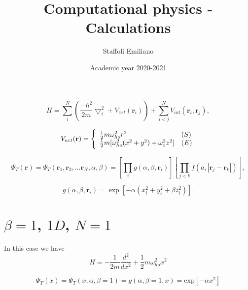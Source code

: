 \documentclass{article}
\title{Computational physics - Calculations}
\author{Staffoli Emiliano}
\date{Academic year 2020-2021}
\begin{document}
\maketitle
\thispagestyle{empty}
\newpage
\setcounter{page}{1}

\begin{equation}
    H = \sum_i^N \left(\frac{-\hbar^2}{2m}{\bigtriangledown }_{i}^2 +V_{ext}({\mathbf{r}}_i)\right)  + \sum_{i<j}^{N} V_{int}({\mathbf{r}}_i,{\mathbf{r}}_j),
\end{equation}

\begin{equation}
    V_{ext}(\mathbf{r}) = \Bigg\{ 
    \begin{array}{ll} \frac{1}{2}m\omega_{ho}^2r^2 & (S)\\ \strut \frac{1}{2}m[\omega_{ho}^2(x^2+y^2) + \omega_z^2z^2] & (E) 
    \label{trap_eqn}
\end{array}
\end{equation}

\begin{equation}
    \Psi_T(\mathbf{r})=\Psi_T(\mathbf{r}_1, \mathbf{r}_2, \dots \mathbf{r}_N,\alpha,\beta)
    =\left[
    \prod_i g(\alpha,\beta,\mathbf{r}_i)
    \right]
    \left[
    \prod_{j<k}f(a,|\mathbf{r}_j-\mathbf{r}_k|)
    \right],
\label{eq:trialwf}
\end{equation}

\begin{equation}
    g(\alpha,\beta,\mathbf{r}_i)= \exp{[-\alpha(x_i^2+y_i^2+\beta z_i^2)]}.
\end{equation}





\section{$\beta = 1$, $1D$, $N=1$}
In this case we have
\begin{equation*}
     H = -\frac{1}{2m} \frac{d^2}{dx^2} + \frac{1}{2} m \omega_{ho}^2 x^2
\end{equation*}

\begin{equation*}
    \Psi_T(x)=\Psi_T(x,\alpha,\beta=1)
    = g(\alpha,\beta=1,x) = \text{exp}\left[-\alpha x^2\right]
\end{equation*}
 
\end{document}
